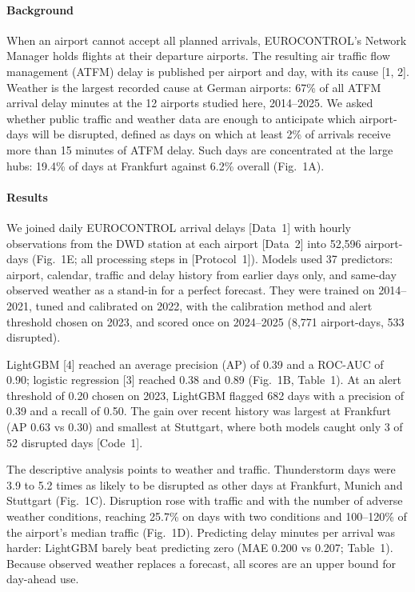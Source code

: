 \documentclass[10pt,a4paper,epsf,apalike]{article}
\begin{document}
\paragraph{Background}
When an airport cannot accept all planned arrivals, EUROCONTROL's Network Manager holds flights at their departure airports. The resulting air traffic flow management (ATFM) delay is published per airport and day, with its cause [1, 2]. Weather is the largest recorded cause at German airports: 67\% of all ATFM arrival delay minutes at the 12 airports studied here, 2014--2025. We asked whether public traffic and weather data are enough to anticipate which airport-days will be disrupted, defined as days on which at least 2\% of arrivals receive more than 15 minutes of ATFM delay. Such days are concentrated at the large hubs: 19.4\% of days at Frankfurt against 6.2\% overall (Fig.~1A).

\paragraph{Results}
We joined daily EUROCONTROL arrival delays [Data~1] with hourly observations from the DWD station at each airport [Data~2] into 52,596 airport-days (Fig.~1E; all processing steps in [Protocol~1]). Models used 37 predictors: airport, calendar, traffic and delay history from earlier days only, and same-day observed weather as a stand-in for a perfect forecast. They were trained on 2014--2021, tuned and calibrated on 2022, with the calibration method and alert threshold chosen on 2023, and scored once on 2024--2025 (8,771 airport-days, 533 disrupted).

LightGBM [4] reached an average precision (AP) of 0.39 and a ROC-AUC of 0.90; logistic regression [3] reached 0.38 and 0.89 (Fig.~1B, Table~1). At an alert threshold of 0.20 chosen on 2023, LightGBM flagged 682 days with a precision of 0.39 and a recall of 0.50. The gain over recent history was largest at Frankfurt (AP 0.63 vs 0.30) and smallest at Stuttgart, where both models caught only 3 of 52 disrupted days [Code~1].

The descriptive analysis points to weather and traffic. Thunderstorm days were 3.9 to 5.2 times as likely to be disrupted as other days at Frankfurt, Munich and Stuttgart (Fig.~1C). Disruption rose with traffic and with the number of adverse weather conditions, reaching 25.7\% on days with two conditions and 100--120\% of the airport's median traffic (Fig.~1D). Predicting delay minutes per arrival was harder: LightGBM barely beat predicting zero (MAE 0.200 vs 0.207; Table~1). Because observed weather replaces a forecast, all scores are an upper bound for day-ahead use.
\end{document}
